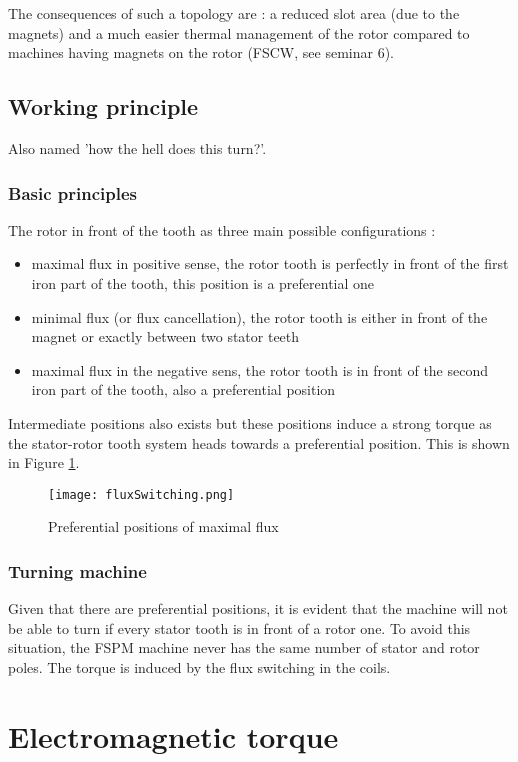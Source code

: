 The consequences of such a topology are : a reduced slot area (due to the magnets) and a much easier thermal management of the rotor compared to machines having magnets on the rotor (FSCW, see seminar 6). 

\subsection{Working principle}
Also named 'how the hell does this turn?'. 

\subsubsection{Basic principles}
The rotor in front of the tooth as three main possible configurations : 
\begin{itemize}
    \item maximal flux in positive sense, the rotor tooth is perfectly in front of the first iron part of the tooth, this position is a preferential one
    \item minimal flux (or flux cancellation), the rotor tooth is either in front of the magnet or exactly between two stator teeth
    \item maximal flux in the negative sens, the rotor tooth is in front of the second iron part of the tooth, also a preferential position
\end{itemize}
Intermediate positions also exists but these positions induce a strong torque as the stator-rotor tooth system heads towards a preferential position. This is shown in Figure \ref{fig:fluxswitching}.
\begin{figure}
    \centering
    \texttt{[image: fluxSwitching.png]}
    \caption{Preferential positions of maximal flux}
    \label{fig:fluxswitching}
\end{figure}

\subsubsection{Turning machine}
Given that there are preferential positions, it is evident that the machine will not be able to turn if every stator tooth is in front of a rotor one. To avoid this situation, the FSPM machine never has the same number of stator and rotor poles. The torque is induced by the flux switching in the coils.

\section{Electromagnetic torque}

